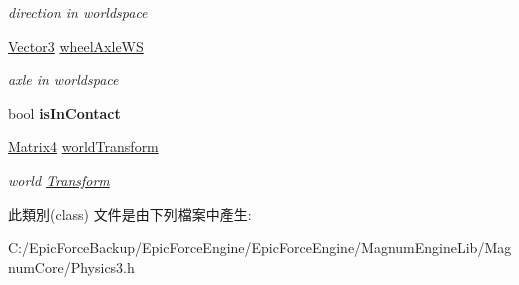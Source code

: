 \begin{DoxyCompactItemize}
\begin{DoxyCompactList}\small\item\em direction in worldspace \end{DoxyCompactList}\item 
\hyperlink{class_magnum_1_1_vector3}{Vector3} \hyperlink{class_magnum_1_1_physics3_1_1_vehicle_1_1_wheel_info_a9cf9d9d7dc9604ae187efd6b6720f0a5}{wheel\+Axle\+WS}\hypertarget{class_magnum_1_1_physics3_1_1_vehicle_1_1_wheel_info_a9cf9d9d7dc9604ae187efd6b6720f0a5}{}\label{class_magnum_1_1_physics3_1_1_vehicle_1_1_wheel_info_a9cf9d9d7dc9604ae187efd6b6720f0a5}

\begin{DoxyCompactList}\small\item\em axle in worldspace \end{DoxyCompactList}\item 
bool {\bfseries is\+In\+Contact}\hypertarget{class_magnum_1_1_physics3_1_1_vehicle_1_1_wheel_info_a18e220738f90d2e2904bc3102b4d7ecc}{}\label{class_magnum_1_1_physics3_1_1_vehicle_1_1_wheel_info_a18e220738f90d2e2904bc3102b4d7ecc}

\item 
\hyperlink{class_magnum_1_1_matrix4}{Matrix4} \hyperlink{class_magnum_1_1_physics3_1_1_vehicle_1_1_wheel_info_abf1de9b79001928ff983aa2e2e760c62}{world\+Transform}\hypertarget{class_magnum_1_1_physics3_1_1_vehicle_1_1_wheel_info_abf1de9b79001928ff983aa2e2e760c62}{}\label{class_magnum_1_1_physics3_1_1_vehicle_1_1_wheel_info_abf1de9b79001928ff983aa2e2e760c62}

\begin{DoxyCompactList}\small\item\em world \hyperlink{class_magnum_1_1_transform}{Transform} \end{DoxyCompactList}\end{DoxyCompactItemize}


此類別(class) 文件是由下列檔案中產生\+:\begin{DoxyCompactItemize}
\item 
C\+:/\+Epic\+Force\+Backup/\+Epic\+Force\+Engine/\+Epic\+Force\+Engine/\+Magnum\+Engine\+Lib/\+Magnum\+Core/Physics3.\+h\end{DoxyCompactItemize}
